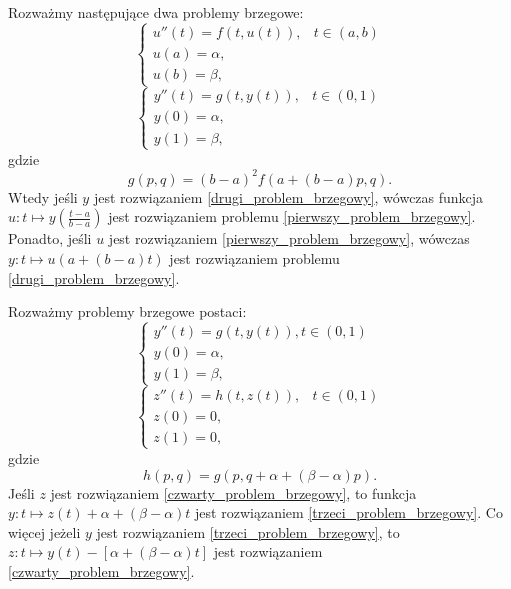 \documentclass[notheorems]{beamer}
\begin{document}
\begin{frame}
\begin{theorem}
Rozważmy następujące dwa problemy brzegowe:
\begin{equation}\label{pierwszy_problem_brzegowy}
\left\{\begin{array}{ll}
u''(t)=f(t,u(t)), & t \in (a,b) \\
u(a)=\alpha, & \\
u(b)=\beta,
\end{array}\right.
\end{equation}
\begin{equation}\label{drugi_problem_brzegowy}
\left\{\begin{array}{ll}
y''(t)=g(t,y(t)), &  t \in (0,1)\\
y(0)= \alpha, & \\
y(1)= \beta,
\end{array}\right.
\end{equation}
gdzie 
$$
g(p,q) = (b-a)^2f(a+(b-a)p,q).
$$
Wtedy jeśli $y$ jest rozwiązaniem \eqref{drugi_problem_brzegowy}, wówczas funkcja $u: t \mapsto y\left(\frac{t-a}{b-a}\right)$ jest rozwiązaniem problemu \eqref{pierwszy_problem_brzegowy}. Ponadto, jeśli $u$ jest rozwiązaniem \eqref{pierwszy_problem_brzegowy}, wówczas $y: t \mapsto u(a+(b-a)t)$ jest rozwiązaniem problemu \eqref{drugi_problem_brzegowy}.
\end{theorem}
\end{frame}
\begin{frame}
\begin{theorem}
Rozważmy problemy brzegowe postaci:
\begin{equation}\label{trzeci_problem_brzegowy}
\left\{\begin{array}{ll}
y''(t)=g(t,y(t)), t \in(0,1)& \\
y(0)=\alpha, & \\
y(1)=\beta,
\end{array}\right.
\end{equation}
\begin{equation}\label{czwarty_problem_brzegowy}
\left\{\begin{array}{ll}
z''(t)=h(t,z(t)), & t \in (0,1)\\
z(0)= 0, & \\
z(1)= 0,
\end{array}\right.
\end{equation}
gdzie 
$$
h(p,q)= g(p,q+\alpha + (\beta - \alpha)p).
$$
Jeśli $z$ jest rozwiązaniem \eqref{czwarty_problem_brzegowy}, to funkcja $y: t \mapsto z(t) + \alpha + (\beta - \alpha)t$ jest rozwiązaniem \eqref{trzeci_problem_brzegowy}. Co więcej jeżeli $y$ jest rozwiązaniem \eqref{trzeci_problem_brzegowy}, to $z: t \mapsto y(t) - [\alpha + (\beta - \alpha)t]$ jest rozwiązaniem \eqref{czwarty_problem_brzegowy}.
\end{theorem}
\end{frame}
\end{document}
